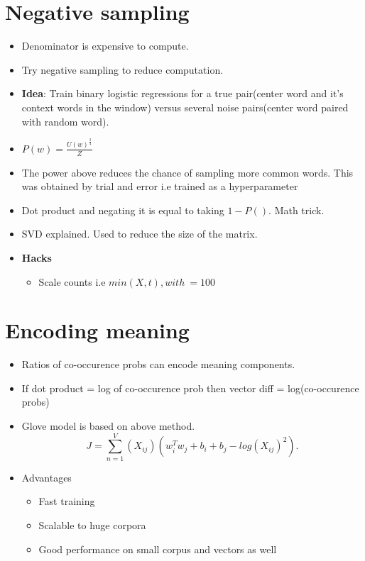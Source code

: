 \documentclass[a4paper]{article}
\begin{document}
\section{Negative sampling}
\begin{itemize}
    \item Denominator is expensive to compute.
    \item Try negative sampling to reduce computation.
    \item \textbf{Idea}: Train binary logistic regressions for a true pair(center word and it's context words in the window) versus several noise pairs(center word paired with random word). 
    \item $P(w) = \frac{U(w)^{\frac{3}{4}}}{Z}$
    \item The power above reduces the chance of sampling more common words. This was obtained by trial and error i.e trained as a hyperparameter
    \item Dot product and negating it is equal to taking $1 - P()$. Math trick.
    \item SVD explained. Used to reduce the size of the matrix.
    \item \textbf{Hacks}  
        \begin{itemize}
            \item Scale counts i.e  $min(X,t), with ~= 100$
        \end{itemize}
\end{itemize}
\section{Encoding meaning}
\begin{itemize}
    \item Ratios of co-occurence probs can encode meaning components.
    \item If dot product = log of co-occurence prob then vector diff = log(co-occurence probs)
    \item Glove model is based on above method.
        \[
            J = \sum_{n=1}^{V} (X_{ij}) (w_{i}^{T}w_{j} + b_{i} + b_{j} - log(X_{ij})^{2})
        .\] 
    \item Advantages
        \begin{itemize}
            \item Fast training
            \item Scalable to huge corpora
            \item Good performance on small corpus and vectors as well
        \end{itemize}
\end{itemize}
\end{document}

